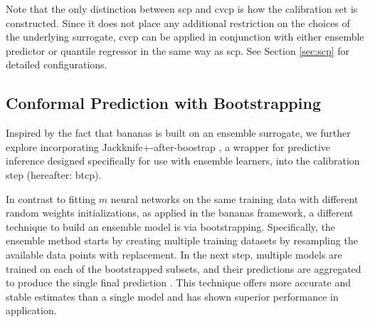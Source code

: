 \documentclass[a4paper,oneside,bibliography=totoc]{scrbook}
\begin{document}
Note that the only distinction between \gls{scp} and \gls{cvcp} is how the calibration set is constructed. Since it does not place any additional restriction on the choices of the underlying surrogate, \gls{cvcp} can be applied in conjunction with either ensemble predictor or quantile regressor in the same way as \gls{scp}. See Section \ref{sec:scp} for detailed configurations.

\subsection{Conformal Prediction with Bootstrapping}
Inspired by the fact that \gls{bananas} is built on an ensemble surrogate, we further explore incorporating Jackknife+-after-boostrap \cite{kim2020predictive}, a wrapper for predictive inference designed specifically for use with ensemble learners, into the calibration step (hereafter: \gls{btcp}).

In contrast to fitting $m$ neural networks on the same training data with different random weights initializations, as applied in the \gls{bananas} framework, a different technique to build an ensemble model is via bootstrapping. Specifically, the ensemble method starts by creating multiple training datasets by resampling the available data points with replacement. In the next step, multiple models are trained on each of the bootstrapped subsets, and their predictions are aggregated to produce the single final prediction \cite{breiman96}. This technique offers more accurate and stable estimates than a single model and has shown superior performance in application.
\end{document}
